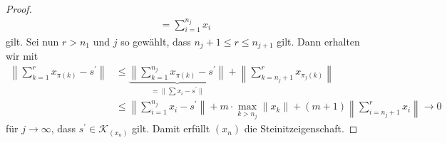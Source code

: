 \begin{proof}
\begin{align*}
		=
		\sum \limits_{i = 1}^{n_j} x_i
	\end{align*}
	gilt. Sei nun $ r > n_1  $ und $ j $ so gewählt, dass $ n_j + 1 \leq r \leq n_{j+1}  $ gilt.
	Dann erhalten wir mit
	\begin{align*}
		\left\|
		\sum \limits_{k=1}^r x_{\pi(k)} - s^\prime 
		\right\|
		&\leq
		\underbrace{\left\|
		\sum \limits_{k=1}^{n_j} x_{\pi(k)} - s^\prime 
		\right\| }_{
		= \| \sum x_i - s^\prime \|
		}
		+
		\left\|
		\sum \limits_{k = n_j +1}^{r}
		x_{\pi_j(k)}
		\right\|\\
		&\leq
		\left\|
		\sum \limits_{i=1}^{n_j} x_{i} - s^\prime 
		\right\|
		+
		m \cdot \max  \limits_{k > n_j } \| x_k \|
		+
		(m+1 ) 
		\left\| \sum \limits_{i = n_j +1}^r x_i \right\|
		\rightarrow 0
	\end{align*}
	für $ j \to \infty $, dass $ s^\prime \in \mathcal{K}_{\left(x_n \right)}  $ gilt.
	Damit erfüllt $ (x_n) $ die Steinitzeigenschaft.
\end{proof}



